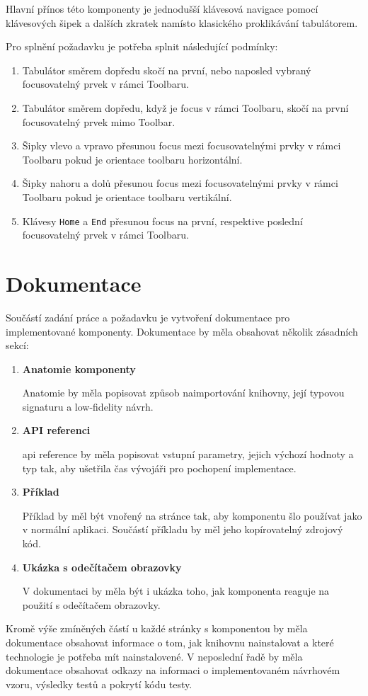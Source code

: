 Hlavní přínos této komponenty je jednodušší klávesová navigace pomocí klávesových šipek a dalších zkratek namísto klasického proklikávání tabulátorem.

Pro splnění požadavku \hyperref[ofr11]{} je potřeba splnit následující podmínky:

\begin{enumerate}
    \item Tabulátor směrem dopředu skočí na první, nebo naposled vybraný focusovatelný prvek v rámci Toolbaru.
    \item Tabulátor směrem dopředu, když je focus v rámci Toolbaru, skočí na první focusovatelný prvek mimo Toolbar.
    \item Šipky vlevo a vpravo přesunou focus mezi focusovatelnými prvky v rámci Toolbaru pokud je orientace toolbaru horizontální.
    \item Šipky nahoru a dolů přesunou focus mezi focusovatelnými prvky v rámci Toolbaru pokud je orientace toolbaru vertikální.
    \item Klávesy \texttt{Home} a \texttt{End} přesunou focus na první, respektive poslední focusovatelný prvek v rámci Toolbaru.
\end{enumerate}

\section{Dokumentace}

Součástí zadání práce a požadavku \hyperref[nfr14]{} je vytvoření dokumentace pro implementované komponenty.
Dokumentace by měla obsahovat několik zásadních sekcí:

\begin{enumerate}
    \item \textbf{Anatomie komponenty}

          Anatomie by měla popisovat způsob naimportování knihovny, její typovou signaturu a low-fidelity návrh.

    \item \textbf{API referenci}

          \gls{api} reference by měla popisovat vstupní parametry, jejich výchozí hodnoty a typ tak, aby ušetřila čas vývojáři pro pochopení implementace.

    \item \textbf{Příklad}

          Příklad by měl být vnořený na stránce tak, aby komponentu šlo používat jako v normální aplikaci. Součástí příkladu by měl jeho kopírovatelný zdrojový kód.

    \item \textbf{Ukázka s odečítačem obrazovky}

          V dokumentaci by měla být i ukázka toho, jak komponenta reaguje na použití s odečítačem obrazovky.

\end{enumerate}

Kromě výše zmíněných částí u každé stránky s komponentou by měla dokumentace obsahovat informace o tom, jak knihovnu nainstalovat a které technologie je potřeba mít nainstalovené.
V neposlední řadě by měla dokumentace obsahovat odkazy na informaci o implementovaném návrhovém vzoru, výsledky testů a pokrytí kódu testy.
